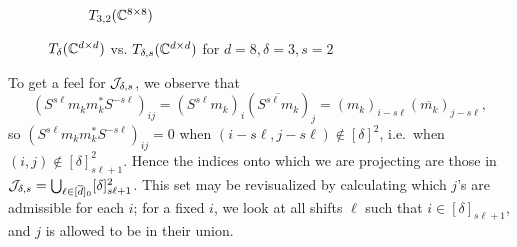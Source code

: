 \begin{figure}
\begin{subfigure}[b]{0.4\textwidth}
    \caption{$T_{3, 2}(\mathbb{C}^{8 \times 8})$}
  \end{subfigure}
  \caption{$T_\delta(\mathbb{C}^{d \times d})$ vs. $T_{\delta, s}(\mathbb{C}^{d \times d})$ for $d = 8, \delta = 3, s = 2$}
  \label{fig:T_delta_s}  
\end{figure}
To get a feel for $\mathcal{J}_{\delta, s}$, we observe that \[\left(S^{s \ell} m_k m_k^* S^{-s \ell}\right)_{ij} = (S^{s \ell} m_k)_i (\overline{S^{s \ell} m_k})_j = (m_k)_{i - s \ell} (\overline{m_k})_{j - s\ell},\] so $\left(S^{s \ell} m_k m_k^* S^{-s \ell}\right)_{ij} = 0$ when $(i - s \ell, j - s \ell) \notin [\delta]^2$, i.e.~when $(i, j) \notin [\delta]^2_{s \ell + 1}$.  Hence the indices onto which we are projecting are those in $\mathcal{J}_{\delta, s} = \bigcup_{\ell \in [\overline{d}]_0} [\delta]_{s \ell + 1}^2$.  This set may be revisualized by calculating which $j$'s are admissible for each $i$; for a fixed $i$, we look at all shifts $\ell$ such that $i \in [\delta]_{s\ell + 1}$, and $j$ is allowed to be in their union.  

